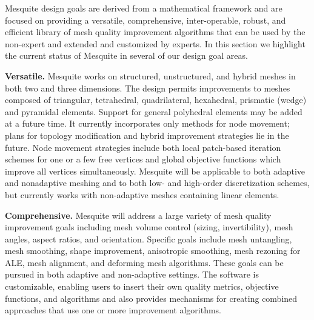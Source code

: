 Mesquite design goals are derived from a mathematical framework and
are focused on providing a versatile, comprehensive, inter-operable,
robust, and efficient library of mesh quality improvement algorithms
that can be used by the non-expert and extended and customized by
experts.  In this section we highlight the current status of Mesquite
in several of our design goal areas. \newline


{\bf Versatile.}  Mesquite works on structured, unstructured, and
hybrid meshes in both two and three dimensions. The design permits
improvements to meshes composed of triangular, tetrahedral,
quadrilateral, hexahedral, prismatic (wedge) and pyramidal elements.
Support for general polyhedral elements may be added at a future time.
It currently incorporates
only methods for node movement; plans for topology modification and
hybrid improvement strategies lie in the future.  Node movement
strategies include both local patch-based iteration schemes for one or
a few free vertices and global objective functions which improve all
vertices simultaneously. Mesquite will be applicable to both adaptive
and nonadaptive meshing and to both low- and high-order discretization
schemes, but currently works with non-adaptive meshes containing
linear elements. \newline

{\bf Comprehensive.}  Mesquite will address a large variety of mesh
quality improvement goals including mesh volume control (sizing,
invertibility), mesh angles, aspect ratios, and orientation. Specific
goals include mesh untangling, mesh smoothing, shape improvement,
anisotropic smoothing, mesh rezoning for ALE, mesh alignment, and
deforming mesh algorithms. These goals can be pursued in both adaptive
and non-adaptive settings. The software is customizable, enabling
users to insert their own quality metrics, objective functions, and
algorithms and also provides mechanisms for creating combined
approaches that use one or more improvement algorithms. \newline



